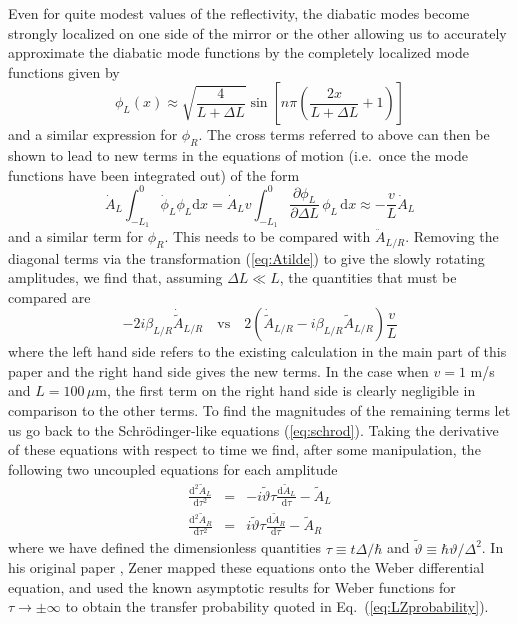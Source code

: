 \documentclass[twocolumn,english,pra,aps,superscriptaddress,floatfix]{revtex4-1}
\begin{document}
Even for quite modest values of the reflectivity, the diabatic modes become strongly localized on one side of the mirror or the other allowing us to accurately approximate the diabatic mode functions by the completely localized mode functions given by
\begin{equation}
\phi_{L}(x) \approx \sqrt{\frac{4}{L+\Delta L}} \sin \left[ n \pi \left( \frac{2x}{L+\Delta L}+1\right) \right]
\end{equation}
and a similar expression for $\phi_{R}$. The cross terms referred to above can then be shown to lead to new terms in the equations of motion (i.e.\ once the mode functions have been integrated out) of the form 
\begin{equation}
\dot{A}_{L} \int_{-L_{1}}^{0} \dot{\phi}_{L} \phi_{L} \mathrm{d}x= \dot{A}_{L} v \int_{-L_{1}}^{0} \frac{\partial \phi_{L}}{\partial \Delta L}  \, \phi_{L} \, \mathrm{d}x \approx -\frac{v}{L} \dot{A}_{L}
\end{equation}
and a similar term for $\phi_{R}$. This needs to be compared with $\ddot{A}_{L/R}$. Removing the diagonal terms via the transformation (\ref{eq:Atilde}) to give the slowly rotating amplitudes, we find that, assuming $\Delta L \ll L$, the quantities that must be compared are
\begin{equation}
-2 i \beta_{L/R} \dot{\tilde{A}}_{L/R} \quad \mbox{vs} \quad 2(\dot{\tilde{A}}_{L/R}-i\beta_{L/R}\tilde{A}_{L/R})\frac{v}{L} 
\label{eq:comparison}
\end{equation}
where the left hand side refers to the existing calculation in the main part of this paper and the right hand side gives the new terms.
In the case when $v =  1$ m/s and $L=100 \, \mu$m, the first term on the right hand side is clearly negligible in comparison to the other terms. To find the magnitudes of the remaining terms let us go back to the Schr\"{o}dinger-like equations (\ref{eq:schrod}). Taking the derivative of these equations with respect to time we find, after some manipulation, the following two uncoupled equations for each amplitude 
\begin{eqnarray}
\frac{\mathrm{d}^2 \tilde{A}_{L}}{\mathrm{d} \tau^2} & = & -i \tilde{\vartheta} \tau \frac{\mathrm{d} \tilde{A}_{L}}{\mathrm{d} \tau}-\tilde{A}_{L} \label{eq:LZclosedL} \\
\frac{\mathrm{d}^2 \tilde{A}_{R}}{\mathrm{d} \tau^2} & = & i \tilde{\vartheta} \tau \frac{\mathrm{d} \tilde{A}_{R}}{\mathrm{d} \tau}-\tilde{A}_{R} \label{eq:LZclosedR}
\end{eqnarray}
where we have defined the dimensionless quantities $\tau \equiv t \Delta / \hbar$ and $\tilde{\vartheta} \equiv \hbar \vartheta/ \Delta^2$. In his original paper \cite{zener32}, Zener mapped these equations onto the Weber differential equation, and used the known asymptotic results for Weber functions for $\tau \rightarrow \pm \infty$ to obtain the transfer probability quoted in Eq.\ (\ref{eq:LZprobability}).
\end{document}
